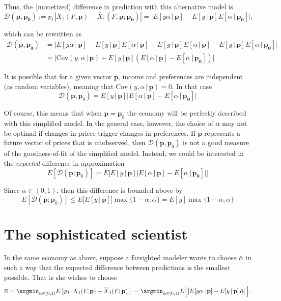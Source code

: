 \documentclass[english, a4paper,12pt]{article}
\begin{document}
Thus, the (monetized) difference in prediction with this alternative model is
	$$\mathcal{D}(\mathbf{p}, \mathbf{p_{0}}) := p_{1} \left| X_{1}(F, \mathbf{p}) - \overline{X}_{1}(F, \mathbf{p}; \mathbf{p_{0}})\right| 
		= \big| E[y\alpha \, | \, \mathbf{p}] - E[y \, | \, \mathbf{p}] E[\alpha \, | \, \mathbf{p_{0}}] \big|,
	$$

which can be rewritten as
	\begin{align*}
		\mathcal{D}(\mathbf{p}, \mathbf{p_{0}})
			&=	\big| E[y\alpha \, | \, \mathbf{p}] - E[y \, | \, \mathbf{p}] E[\alpha \, | \, \mathbf{p}] + E[y \, | \, \mathbf{p}] E[\alpha \, | \, \mathbf{p}] - E[y \, | \, \mathbf{p}] E[\alpha \, | \, \mathbf{p_{0}}] \big|	\\
			&=	\big| \mathrm{Cov}(y,\alpha \,|\, \mathbf{p}) + E[y\,|\, \mathbf{p}]\left(E[\alpha \, | \, \mathbf{p}] - E[\alpha \, | \, \mathbf{p_{0}}]\right) \big|
	\end{align*}

It is possible that for a given vector $\mathbf{p}$, income and preferences are independent (as random variables), meaning that $\mathrm{Cov}(y,\alpha \,|\, \mathbf{p}) = 0$. In that case
	$$\mathcal{D}(\mathbf{p}, \mathbf{p}_{0}) = E[y\,|\, \mathbf{p}]\big|E[\alpha \, | \, \mathbf{p}] - E[\alpha \, | \, \mathbf{p_{0}}]\big| $$

Of course, this means that when $\mathbf{p} = \mathbf{p}_{0}$ the economy will be perfectly described with this simplified model. In the general case, however, the choice of $\overline{\alpha}$ may not be optimal if changes in prices trigger changes in preferences. If $\mathbf{p}$ represents a future vector of prices that is unobserved, then $\mathcal{D}(\mathbf{p}, \mathbf{p}_{0})$ is not a good measure of the goodness-of-fit of the simplified model. Instead, we could be interested in the \textit{expected} difference in approximation
	$$E[\mathcal{D}(\mathbf{p}; \mathbf{p}_{0})] =
		E\Big[ E[y\,|\,\mathbf{p}]\big|E[\alpha \, | \, \mathbf{p}] - E[\alpha \, | \, \mathbf{p_{0}}]\big| \Big]
	$$

Since $\alpha \in (0,1)$, then this difference is bounded above by
	$$E[\mathcal{D}(\mathbf{p}; \mathbf{p}_{0})] \leq 
		E\Big[ E[y\,|\,\mathbf{p}]\Big] \max\{ 1 - \overline{\alpha}, \overline{\alpha}\} = E[y]\max\big\{1-\overline{\alpha}, \overline{\alpha}\big\}
	$$
 
\section{The sophisticated scientist}
In the same economy as above, suppose a farsighted modeler wants to choose $\overline{\alpha}$ in such a way that the expected difference between predictions is the smallest possible. That is she wishes to choose
	\begin{equation*} %
		\overline{\alpha}
			= \argmin_{\hat{\alpha} \in (0,1)} E\left[p_{1}\left| X_{1}(F,\mathbf{p}) - \overline{X}_{1}(F; \mathbf{p})\right|\right]
			= \argmin_{\hat{\alpha} \in (0,1)} E\Big[\big| E[y \alpha\, |\, \mathbf{p}] - E[y \,|\, \mathbf{p}]\, \hat{\alpha} \big|\Big].
	\end{equation*}
\end{document}
